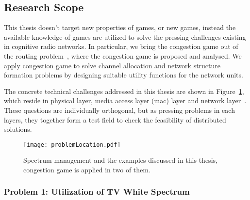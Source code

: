 \subsection{Research Scope}
This thesis doesn't target new properties of games, or new games, instead the available knowledge of games are utilized to solve the pressing challenges existing in cognitive radio networks.
In particular, we bring the congestion game out of the routing problem~\cite{Ackermann06purenash, Papadimitriou:2001:AGI}, where the congestion game is proposed and analysed.
We apply congestion game to solve channel allocation and network structure formation problems by designing suitable utility functions for the network units.

The concrete technical challenges addressed in this thesis are shown in Figure~\ref{problemLocation}, which reside in physical layer, media access layer (\gls{mac}) layer and network layer~\cite{osi}. 
These questions are individually orthogonal, but as pressing problems in each layers, they together form a test field to check the feasibility of distributed solutions.

\begin{figure}[h!]
  \centering
  \texttt{[image: problemLocation.pdf]}
  \caption{Spectrum management and the examples discussed in this thesis, congestion game is applied in two of them.}
\label{problemLocation}
\end{figure}

\subsubsection{Problem 1: Utilization of TV White Spectrum}



